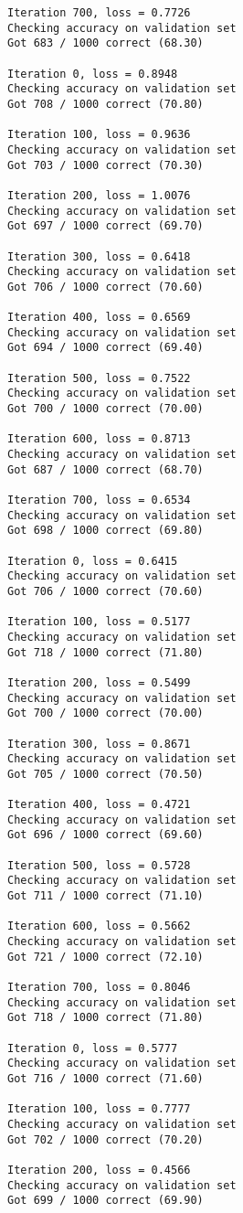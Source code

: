 \documentclass[11pt]{article}
\begin{document}
\begin{Verbatim}[commandchars=\\\{\}]
Iteration 700, loss = 0.7726
Checking accuracy on validation set
Got 683 / 1000 correct (68.30)

Iteration 0, loss = 0.8948
Checking accuracy on validation set
Got 708 / 1000 correct (70.80)

Iteration 100, loss = 0.9636
Checking accuracy on validation set
Got 703 / 1000 correct (70.30)

Iteration 200, loss = 1.0076
Checking accuracy on validation set
Got 697 / 1000 correct (69.70)

Iteration 300, loss = 0.6418
Checking accuracy on validation set
Got 706 / 1000 correct (70.60)

Iteration 400, loss = 0.6569
Checking accuracy on validation set
Got 694 / 1000 correct (69.40)

Iteration 500, loss = 0.7522
Checking accuracy on validation set
Got 700 / 1000 correct (70.00)

Iteration 600, loss = 0.8713
Checking accuracy on validation set
Got 687 / 1000 correct (68.70)

Iteration 700, loss = 0.6534
Checking accuracy on validation set
Got 698 / 1000 correct (69.80)

Iteration 0, loss = 0.6415
Checking accuracy on validation set
Got 706 / 1000 correct (70.60)

Iteration 100, loss = 0.5177
Checking accuracy on validation set
Got 718 / 1000 correct (71.80)

Iteration 200, loss = 0.5499
Checking accuracy on validation set
Got 700 / 1000 correct (70.00)

Iteration 300, loss = 0.8671
Checking accuracy on validation set
Got 705 / 1000 correct (70.50)

Iteration 400, loss = 0.4721
Checking accuracy on validation set
Got 696 / 1000 correct (69.60)

Iteration 500, loss = 0.5728
Checking accuracy on validation set
Got 711 / 1000 correct (71.10)

Iteration 600, loss = 0.5662
Checking accuracy on validation set
Got 721 / 1000 correct (72.10)

Iteration 700, loss = 0.8046
Checking accuracy on validation set
Got 718 / 1000 correct (71.80)

Iteration 0, loss = 0.5777
Checking accuracy on validation set
Got 716 / 1000 correct (71.60)

Iteration 100, loss = 0.7777
Checking accuracy on validation set
Got 702 / 1000 correct (70.20)

Iteration 200, loss = 0.4566
Checking accuracy on validation set
Got 699 / 1000 correct (69.90)


\end{Verbatim}
\end{document}
